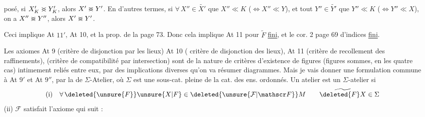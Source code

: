 posé, si $X'_K\mathrel{>\mkern-14mu<}Y'_K$, alors $X'\mathrel{>\mkern-14mu<}Y'$. En d'autres termes, si $\forall\, X''\in\widetilde{X'}$  que $X''\ll K$ ($\Leftrightarrow X''\ll Y$), et tout $Y''\in\widetilde{Y'}$  que $Y''\ll K$ ($\Longleftrightarrow Y''\ll X$), on a $X''\mathrel{>\mkern-14mu<}Y''$, alors $X'\mathrel{>\mkern-14mu<}Y'$.

Ceci implique At $11'$,  At 10, et la prop. de la page 73.
Donc cela implique At 11 pour  $\widetilde F$ \uline{fini}, et le cor. 2 page 69   d'indices \uline{fini}.

 Les axiomes At 9 (critère de disjonction par les lieux)  At 10  ( critère de disjonction des lieux), At 11 (critère de recollement des raffinements),   (critère de compatibilité par intersection) sont de la nature de critères d'existence de figures (figures sommes,  en les quatre cas) intimement reliés entre eux, par des implications diverses\unsure{,|;} qu'on va résumer  diagrammes. Mais je vais  donner une formulation commune   à At $9'$ et At $9''$, par la  de $\Sigma$-Atelier, où $\Sigma$ est une sous-cat. pleine de la cat. des ens. ordonnés. Un atelier est un $\Sigma$-atelier si
\[
\text{(i)}\quad \forall\,\deleted{\unsure{F}}\unsure{X|F}\in\deleted{\unsure{\mathcal F|\mathscr F}}M\qquad \widetilde{\deleted{F}X}\in\Sigma
\]
(ii) $\mathcal F$ satisfait l'axiome qui suit :
